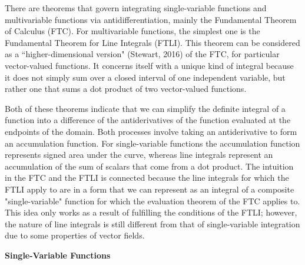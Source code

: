 \documentclass[11pt]{article}
\begin{document}
There are theorems that govern integrating single-variable functions and multivariable functions via antidifferentiation, mainly the Fundamental Theorem of Calculus (FTC). For multivariable functions, the simplest one is the Fundamental Theorem for Line Integrals (FTLI). This theorem can be considered as a “higher-dimensional version" (Stewart, 2016) of the FTC, for particular vector-valued functions. It concerns itself with a unique kind of integral because it does not simply sum over a closed interval of one independent variable, but rather one that sums a dot product of two vector-valued functions.

Both of these theorems indicate that we can simplify the definite integral of a function into a difference of the antiderivatives of the function evaluated at the endpoints of the domain. Both processes involve taking an antiderivative to form an accumulation function. For single-variable functions the accumulation function represents signed area under the curve, whereas line integrals represent an accumulation of the sum of scalars that come from a dot product. The intuition in the FTC and the FTLI is connected because the line integrals for which the FTLI apply to are in a form that we can represent as an integral of a composite "single-variable" function for which the evaluation theorem of the FTC applies to. This idea only works as a result of fulfilling the conditions of the FTLI; however, the nature of line integrals is still different from that of single-variable integration due to some properties of vector fields. 

{\centering{}\textbf{Single-Variable Functions}

}


\end{document}
